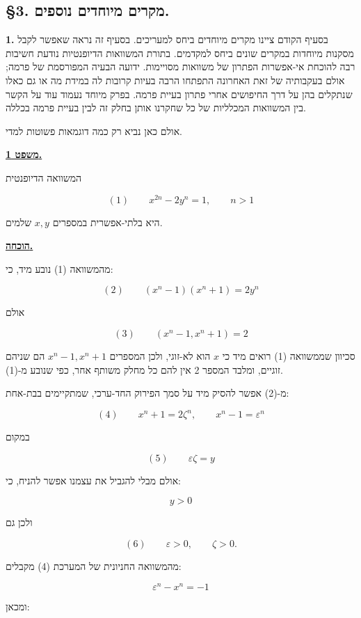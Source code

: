 \subsection*{\S3. מקרים מיוחדים נוספים.}

\noindent\textbf{1.} בסעיף הקודם ציינו מקרים מיוחדים ביחס למעריכים. בסעיף זה נראה
שאפשר לקבל מסקנות מיוחדות במקרים שונים ביחס למקדמים. בתורת המשוואות
הדיופנטיות נודעת חשיבות רבה להוכחת אי-אפשרות הפתרון של משוואות
מסויימות. ידועה הבעיה המפורסמת של פרמה; אולם בעקבותיה של זאת
האחרונה התפתחו הרבה בעיות קרובות לה במידת מה או גם כאלו שנתקלים
בהן על דרך החיפושים אחרי פתרון בעיית פרמה. בפרק מיוחד נעמוד עוד
על הקשר בין המשוואות המכלליות של כל שחקרנו אותן בחלק זה לבין בעיית
פרמה בכללה. %

אולם כאן נביא רק כמה דוגמאות פשוטות למדי.

\noindent\textbf{\underline{משפט 1.}}

המשוואה הדיופנטית

\[ (1) \qquad x^{2n} - 2y^n = 1 , \qquad n > 1 \]

היא בלתי-אפשרית במספרים $x, y$ שלמים.

\noindent\textbf{\underline{הוכחה.}}

מהמשוואה (1) נובע מיד, כי:

\[ (2) \qquad (x^n - 1)(x^n + 1) = 2y^n \]

אולם

\[ (3) \qquad (x^n - 1 , x^n + 1) = 2 \]

סכיוון שממשוואה (1) רואים מיד כי $x$ הוא לא-זוגי, ולכן המספרים
$x^n - 1, x^n + 1$ הם שניהם זוגיים, ומלבד המספר 2 אין להם כל מחלק
משותף אחר, כפי שנובע מ-(1).

מ-(2) אפשר להסיק מיד על סמך הפירוק החד-ערכי, שמתקיימים בבת-אחת:

\[ (4) \qquad x^n + 1 = 2\zeta^n , \qquad x^n - 1 = \varepsilon^n \]

במקום

\[ (5) \qquad \varepsilon\zeta = y \]

אולם מבלי להגביל את עצמנו אפשר להניח, כי:

\[ y > 0 \]

ולכן גם

\[ (6) \qquad \varepsilon > 0 , \qquad \zeta > 0 . \]

מהמשוואה החניונית של המערכת (4) מקבלים:

\[ \varepsilon^n - x^n = -1 \]

ומכאן:

